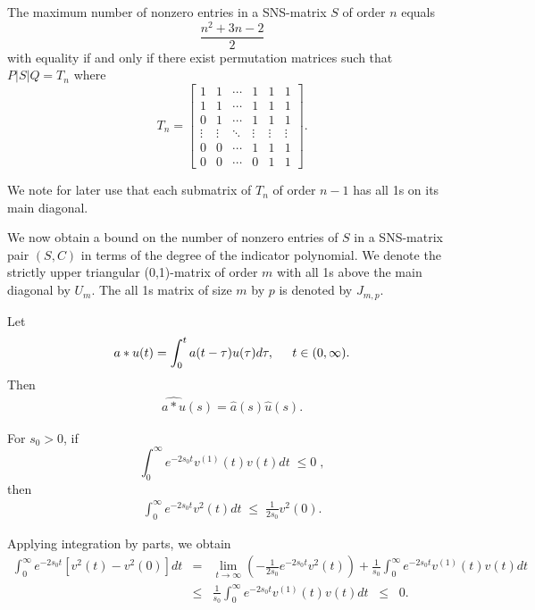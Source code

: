 \begin{theorem} 
\label{th:gibson} 
The maximum number of nonzero entries in a {\rm SNS}-matrix
$S$ of order $n$ equals \[\frac{n^{2}+3n-2}{2}\] with
equality if and only if there exist permutation matrices
such that $P|S|Q=T_{n}$ where
\begin{equation} 
\label{eq:gibson} 
T_{n}=\left[\begin{array}{cccccc} 1&1&\cdots&1&1&1\\
1&1&\cdots&1&1&1\\ 0&1&\cdots&1&1&1\\ 
\vdots&\vdots&\ddots&\vdots&\vdots&\vdots\\ 
0&0&\cdots&1&1&1\\ 0&0&\cdots&0&1&1\end{array}\right]. 
\end{equation} 
\end{theorem}

We note for later use that each submatrix of $T_{n}$ of
order $n-1$ has all 1s on its main diagonal.

We now obtain a bound on the number of nonzero entries of
$S$ in a SNS-matrix pair $(S,C)$ in terms of the degree of
the indicator polynomial. We denote the strictly upper
triangular (0,1)-matrix of order $m$ with all 1s above the
main diagonal by $U_{m}$. The all 1s matrix of size $m$ by
$p$ is denoted by $J_{m,p}$.

\begin{proposition}
\label{pro:2.1}  Let
\begin{eqnarray*}
a\ast u(t) = \int_0^t a(t- \tau) u(\tau) d\tau, \hspace{.2in} t \in
(0, \infty).
\end{eqnarray*}
Then
\begin{eqnarray*}
\widehat{a\ast u}(s) = \widehat{a}(s)\widehat{u}(s).
\end{eqnarray*}
\end{proposition}

\begin{lemma}
\label{lem:3.1}
For $s_0 >0$, if
$$
\int_0^{\infty} e^{-2s_0 t}v^{(1)}(t) v(t) dt \; \leq 0 \;,
$$
then
\begin{eqnarray*}
\int_0^{\infty} e^{-2s_0 t} v^2(t) dt \; \leq \; \frac{1}{2s_0} v^2(0).
\end{eqnarray*}
\end{lemma}

Applying integration by parts, we obtain
\begin{eqnarray*}
\int_0^{\infty} e^{-2s_0 t} [v^2(t)-v^2(0)] dt
&=&\lim_{t\rightarrow \infty}\left (
-\frac{1}{2s_0}e^{-2s_0 t}v^2(t) \right ) +\frac{1}{s_0}
\int_0^{\infty} e^{-2s_0 t}v^{(1)}(t)v(t)dt\\
&\leq& \frac{1}{s_0} \int_0^{\infty} e^{-2s_0 t} v^{(1)}(t)v(t) dt \;\;
\leq \;\; 0.
\end{eqnarray*}


